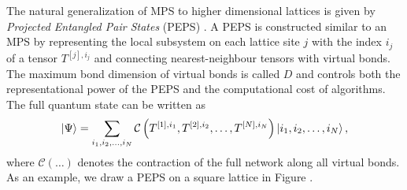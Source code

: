 The natural generalization of MPS to higher dimensional lattices is given by \textit{Projected Entangled Pair States} (PEPS) \cite{cite:algorithms_for_finite_PEPS, cite:mps_and_peps_concepts_symmetries_theorems}. A PEPS is constructed similar to an MPS by representing the local subsystem on each lattice site $j$ with the index $i_j$ of a tensor $T^{[j],i_j}$ and connecting nearest-neighbour tensors with virtual bonds. The maximum bond dimension of virtual bonds is called $D$ and controls both the representational power of the PEPS and the computational cost of algorithms. The full quantum state can be written as
\begin{equation}
	\label{eq:PEPS_definition_general}
	\ket{\Psi} = \sum_{i_1,i_2,\dots,i_N} \mathcal{C}\left(T^{[1],i_1}, T^{[2],i_2}, \dots, T^{[N],i_N}\right) \ket{i_1,i_2,\dots,i_N},
\end{equation}
where $\mathcal{C}(\dots)$ denotes the contraction of the full network along all virtual bonds. As an example, we draw a PEPS on a square lattice in Figure . \par
